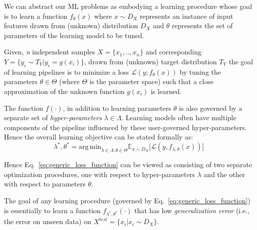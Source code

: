 \iffalse We can abstract our ML problems as embodying a learning procedure whose goal is to learn a function $f_\theta(x)$ where $x \mathtt{\sim} {D_X}$ represents an instance of input features drawn from (unknown) distribution $D_X$ and $\theta$ represents the set of parameters of the learning model to be tuned.

Given, \textit{n} independent samples $X = \{x_1,..,x_n\}$ and corresponding $Y = \{y_i \mathtt{\sim} T_Y | y_i = g(x_i)\}$, drawn from (unknown) target distribution $T_Y$ the goal of learning pipelines is to minimize a loss $\mathcal{L}(y;f_\theta(x))$ by tuning the parameters $\theta \in \Theta$ (where $\Theta$ is the parameter space) such that a close approximation of the unknown function $g(x_i)$ is learned. 
\iffalse 
\begin{equation}
    \theta^* = \mathrm{arg\,min}_{\theta \in \Theta} \mathbb{E}_{x \mathtt{\sim} D_X}\big[\mathcal{L}(y,f_{\theta}(x)) \big]
    \label{eq:loss_function}
\end{equation}
Eq.~\ref{eq:loss_function} indicates that the function $f(\cdot)$ is minimized with respect to $\theta \in \Theta$ (where $\Theta$ is the parameter space) yielding an approximation of the unknown target distribution $T_Y$ and the corresponding optimal value of parameters $\theta^*$.
\fi 

The function $f(\cdot)$, in addition to learning parameters $\theta$ is also governed by a separate set of \textit{hyper-parameters} $\lambda \in \Lambda$. Learning models often have multiple components of the  pipeline influenced by these user-governed hyper-parameters. Hence the overall learning objective can be stated formally as: 
\begin{equation}
    \lambda^*,\theta^* = \mathrm{arg\,min}_{\lambda \in \Lambda;\theta \in \Theta} \mathbb{E}_{x \mathtt{\sim} D_X}\big[\mathcal{L}(y,f_{\lambda,\theta}(x)) \big]
    \label{eq:generic_loss_function}
\end{equation}

\iffalse In Eq.~\ref{eq:generic_loss_function}, $f(\cdot)$ is a function of both hyper-parameters $\lambda \in \Lambda$ and learning parameters $\theta \in \Theta$ both of which are tuned.\fi Hence Eq.~\ref{eq:generic_loss_function} can be viewed as consisting of two separate optimization procedures, one with respect to hyper-parameters $\lambda$ and the other with respect to parameters $\theta$.

The goal of any learning procedure (governed by Eq.~\ref{eq:generic_loss_function}) is essentially to learn a function $f_{\lambda^*,\theta^*}(\cdot)$ that has low \textit{generalization error} (i.e., the error on unseen data) on $X^{test} = \{x_i | x_i \mathtt{\sim} D_X\}$. 

